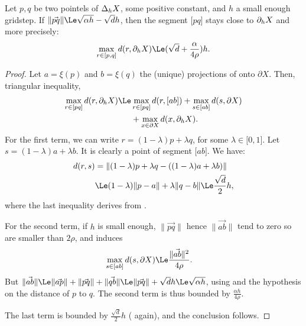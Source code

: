 \begin{theorem}\label{thm-distance-pq-to-dX}
    Let $p,q$ be two pointels of $\Delta_{h} {X}$, some positive
    constant, and $h$ a small enough gridstep. If $\| \vec{pq}\|\Le
    \sqrt{\alpha h} - \sqrt{d}h$, then the segment $\lbrack p q
    \rbrack$ stays close to $\partial_{h} {X}$ and more precisely:
    \begin{align*}
        \max_{r \in \lbrack p, q \rbrack} d( r, \CBh{h}{X}) \Le (\sqrt{d}+\frac{\alpha}{4\rho})h.
    \end{align*}
\end{theorem}
\begin{proof}
    Let $a=\xi(p)$ and $b=\xi(q)$  the (unique) projections of  onto $\partial X$. Then,  triangular inequality,
    \begin{align*}
        \max_{r \in \lbrack p q \rbrack} d( r, \CBh{h}{X})
        \Le & \max_{r \in \lbrack p q \rbrack} d( r, \lbrack a b \rbrack )
        + \max_{s \in \lbrack a b \rbrack} d( s, \partial X ) \\
        & + \max_{x \in \partial X} d( x, \CBh{h}{X} ).
    \end{align*}
    For the first term, we can write $r=(1-\lambda)p+\lambda q$, for
    some $\lambda \in \lbrack 0,1 \rbrack$. Let $s=(1-\lambda)a+\lambda
    b$. It is clearly a point of segment $\lbrack a b \rbrack$. We have:
    \begin{align*}
        d(r,s) & = \| (1-\lambda)p+\lambda q - ((1-\lambda)a+\lambda b) \| \\
        & \Le (1-\lambda)\|p-a\| + \lambda \|q-b\| \Le \frac{\sqrt{d}}{2}h,
    \end{align*}
    where the last inequality derives from
    .

    For the second term, if $h$ is small enough, $\|\vec{pq}\|$ hence
    $\|\vec{ab}\|$ tend to zero so are smaller than $2\rho$, and
     induces
    \begin{align*}
        \max_{s \in \lbrack a b \rbrack} d( s, \partial X ) &\Le \frac{\|\vec{ab}\|^2}{4\rho}.
    \end{align*}
    But $\|\vec{ab}\| \Le \|\vec{ap}\| + \|\vec{pq}\| + \|\vec{qb}\| \Le
    \| \vec{pq}\| + \sqrt{d}h \Le \sqrt{\alpha h}$, using
     and the hypothesis on the distance of
    $p$ to $q$. The second term is thus bounded by $\frac{\alpha
    h}{4\rho}$.

    The last term is bounded by $\frac{\sqrt{d}}{2}h$
    ( again), and the conclusion follows.
\end{proof}

